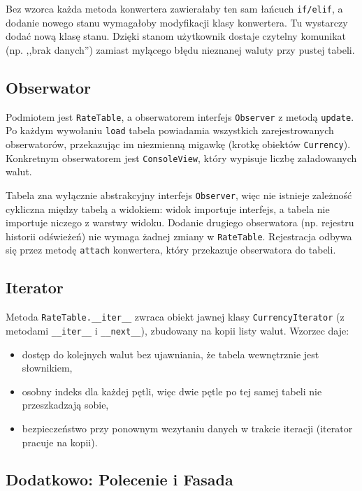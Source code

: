 \documentclass[12pt,a4paper]{article}
\begin{document}
Bez wzorca każda metoda konwertera zawierałaby ten sam łańcuch \texttt{if/elif}, a dodanie nowego stanu wymagałoby modyfikacji klasy konwertera. Tu wystarczy dodać nową klasę stanu. Dzięki stanom użytkownik dostaje czytelny komunikat (np. ,,brak danych'') zamiast mylącego błędu nieznanej waluty przy pustej tabeli.

\subsection{Obserwator}

Podmiotem jest \texttt{RateTable}, a obserwatorem interfejs \texttt{Observer} z metodą \texttt{update}. Po każdym wywołaniu \texttt{load} tabela powiadamia wszystkich zarejestrowanych obserwatorów, przekazując im niezmienną migawkę (krotkę obiektów \texttt{Currency}). Konkretnym obserwatorem jest \texttt{ConsoleView}, który wypisuje liczbę załadowanych walut.

Tabela zna wyłącznie abstrakcyjny interfejs \texttt{Observer}, więc nie istnieje zależność cykliczna między tabelą a widokiem: widok importuje interfejs, a tabela nie importuje niczego z warstwy widoku. Dodanie drugiego obserwatora (np. rejestru historii odświeżeń) nie wymaga żadnej zmiany w \texttt{RateTable}. Rejestracja odbywa się przez metodę \texttt{attach} konwertera, który przekazuje obserwatora do tabeli.

\subsection{Iterator}

Metoda \texttt{RateTable.\_\_iter\_\_} zwraca obiekt jawnej klasy \texttt{CurrencyIterator} (z metodami \texttt{\_\_iter\_\_} i \texttt{\_\_next\_\_}), zbudowany na kopii listy walut. Wzorzec daje:
\begin{itemize}
    \item dostęp do kolejnych walut bez ujawniania, że tabela wewnętrznie jest słownikiem,
    \item osobny indeks dla każdej pętli, więc dwie pętle po tej samej tabeli nie przeszkadzają sobie,
    \item bezpieczeństwo przy ponownym wczytaniu danych w trakcie iteracji (iterator pracuje na kopii).
\end{itemize}

\subsection{Dodatkowo: Polecenie i Fasada}
\end{document}
